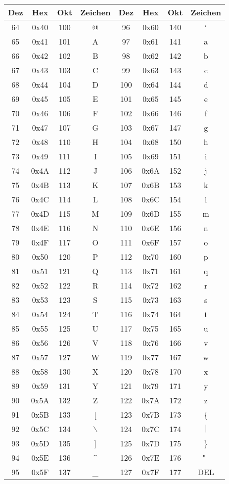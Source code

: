 \documentclass[a4paper]{scrartcl}
\begin{document}
        \begin{longtable}{|c|c|c|c||c|c|c|c|}
        \hline
        Dez & Hex & Okt & Zeichen & Dez & Hex & Okt & Zeichen\\
        \hline
        64 & 0x40 & 100 & @ & 96 & 0x60 & 140 & ` \\
        65 & 0x41 & 101 & A & 97 & 0x61 & 141 & a \\
        66 & 0x42 & 102 & B & 98 & 0x62 & 142 & b \\
        67 & 0x43 & 103 & C & 99 & 0x63 & 143 & c \\
        68 & 0x44 & 104 & D & 100 & 0x64 & 144 & d \\
        69 & 0x45 & 105 & E & 101 & 0x65 & 145 & e \\
        70 & 0x46 & 106 & F & 102 & 0x66 & 146 & f \\
        71 & 0x47 & 107 & G & 103 & 0x67 & 147 & g \\
        72 & 0x48 & 110 & H & 104 & 0x68 & 150 & h \\
        73 & 0x49 & 111 & I & 105 & 0x69 & 151 & i \\
        74 & 0x4A & 112 & J & 106 & 0x6A & 152 & j \\
        75 & 0x4B & 113 & K & 107 & 0x6B & 153 & k \\
        76 & 0x4C & 114 & L & 108 & 0x6C & 154 & l \\
        77 & 0x4D & 115 & M & 109 & 0x6D & 155 & m \\
        78 & 0x4E & 116 & N & 110 & 0x6E & 156 & n \\
        79 & 0x4F & 117 & O & 111 & 0x6F & 157 & o \\
        80 & 0x50 & 120 & P & 112 & 0x70 & 160 & p \\
        81 & 0x51 & 121 & Q & 113 & 0x71 & 161 & q \\
        82 & 0x52 & 122 & R & 114 & 0x72 & 162 & r \\
        83 & 0x53 & 123 & S & 115 & 0x73 & 163 & s \\
        84 & 0x54 & 124 & T & 116 & 0x74 & 164 & t \\
        85 & 0x55 & 125 & U & 117 & 0x75 & 165 & u \\
        86 & 0x56 & 126 & V & 118 & 0x76 & 166 & v \\
        87 & 0x57 & 127 & W & 119 & 0x77 & 167 & w \\
        88 & 0x58 & 130 & X & 120 & 0x78 & 170 & x \\
        89 & 0x59 & 131 & Y & 121 & 0x79 & 171 & y \\
        90 & 0x5A & 132 & Z & 122 & 0x7A & 172 & z \\
        91 & 0x5B & 133 & [ & 123 & 0x7B & 173 & \{ \\
        92 & 0x5C & 134 & $\backslash$ & 124 & 0x7C & 174 & $\mid$\\
        93 & 0x5D & 135 & ] & 125 & 0x7D & 175 & \} \\
        94 & 0x5E & 136 & \^{} & 126 & 0x7E & 176 & "~ \\
        95 & 0x5F & 137 & \_ & 127 & 0x7F & 177 & DEL \\
        \hline
        \end{longtable}
\end{document}
